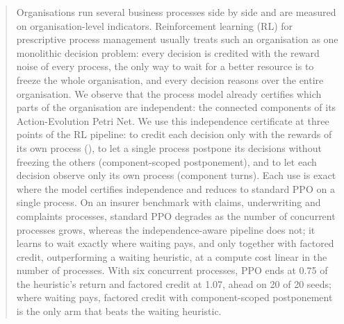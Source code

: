\begin{abstract}
Organisations run several business processes side by side and are measured on
organisation-level indicators. Reinforcement learning (RL) for prescriptive process
management usually treats such an organisation as one monolithic decision problem:
every decision is credited with the reward noise of every process, the only way to
wait for a better resource is to freeze the whole organisation, and every decision
reasons over the entire organisation. We observe that the process model already
certifies which parts of the organisation are independent: the connected components
of its Action-Evolution Petri Net. We use this independence certificate at three points
of the RL pipeline: to credit each decision only with the rewards of its own process
(\nfgae), to let a single process postpone its decisions without freezing the others
(component-scoped postponement), and to let each decision observe only its own process
(component turns). Each use is exact where the model certifies independence and
reduces to standard PPO on a single process. On an insurer benchmark with claims,
underwriting and complaints processes, standard PPO degrades as the number of
concurrent processes grows, whereas the independence-aware pipeline does not; it
learns to wait exactly where waiting pays, and only together with factored credit,
outperforming a waiting heuristic, at a compute cost linear in the number of processes.
With six concurrent processes, PPO ends at 0.75 of the heuristic's return and factored
credit at 1.07, ahead on 20 of 20 seeds; where waiting pays, factored credit with
component-scoped postponement is the only arm that beats the waiting heuristic.

\end{abstract}
